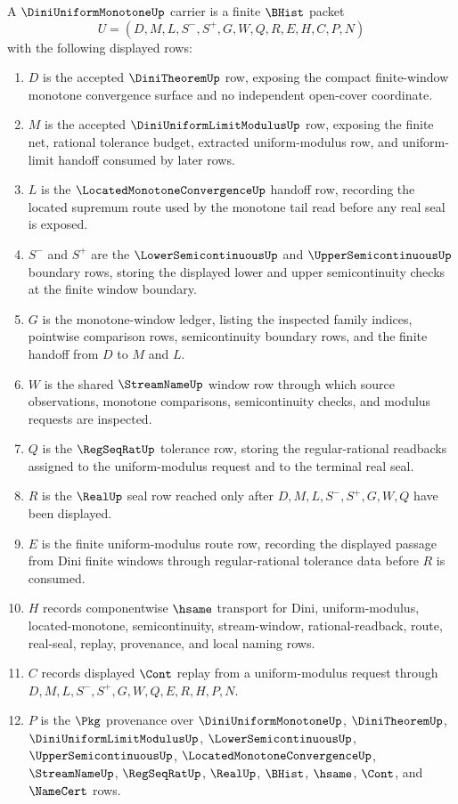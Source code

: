 \begin{definition}\label{def:dini-uniform-monotone-carrier}
A $\DiniUniformMonotoneUp$ carrier is a finite $\BHist$ packet
$$
U=(D,M,L,S^{-},S^{+},G,W,Q,R,E,H,C,P,N)
$$
with the following displayed rows:
\begin{enumerate}
\item $D$ is the accepted $\DiniTheoremUp$ row, exposing the compact finite-window monotone convergence surface and no independent open-cover coordinate.
\item $M$ is the accepted $\DiniUniformLimitModulusUp$ row, exposing the finite net, rational tolerance budget, extracted uniform-modulus row, and uniform-limit handoff consumed by later rows.
\item $L$ is the $\LocatedMonotoneConvergenceUp$ handoff row, recording the located supremum route used by the monotone tail read before any real seal is exposed.
\item $S^{-}$ and $S^{+}$ are the $\LowerSemicontinuousUp$ and $\UpperSemicontinuousUp$ boundary rows, storing the displayed lower and upper semicontinuity checks at the finite window boundary.
\item $G$ is the monotone-window ledger, listing the inspected family indices, pointwise comparison rows, semicontinuity boundary rows, and the finite handoff from $D$ to $M$ and $L$.
\item $W$ is the shared $\StreamNameUp$ window row through which source observations, monotone comparisons, semicontinuity checks, and modulus requests are inspected.
\item $Q$ is the $\RegSeqRatUp$ tolerance row, storing the regular-rational readbacks assigned to the uniform-modulus request and to the terminal real seal.
\item $R$ is the $\RealUp$ seal row reached only after $D,M,L,S^{-},S^{+},G,W,Q$ have been displayed.
\item $E$ is the finite uniform-modulus route row, recording the displayed passage from Dini finite windows through regular-rational tolerance data before $R$ is consumed.
\item $H$ records componentwise $\hsame$ transport for Dini, uniform-modulus, located-monotone, semicontinuity, stream-window, rational-readback, route, real-seal, replay, provenance, and local naming rows.
\item $C$ records displayed $\Cont$ replay from a uniform-modulus request through $D,M,L,S^{-},S^{+},G,W,Q,E,R,H,P,N$.
\item $P$ is the $\Pkg$ provenance over $\DiniUniformMonotoneUp$, $\DiniTheoremUp$, $\DiniUniformLimitModulusUp$, $\LowerSemicontinuousUp$, $\UpperSemicontinuousUp$, $\LocatedMonotoneConvergenceUp$, $\StreamNameUp$, $\RegSeqRatUp$, $\RealUp$, $\BHist$, $\hsame$, $\Cont$, and $\NameCert$ rows.

\end{enumerate}
\end{definition}

